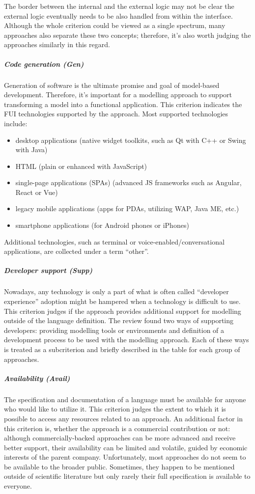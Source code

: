 The border between the internal and the external logic may not be clear\,\textemdash\,the external logic eventually needs to be also handled from within the interface.
Although the whole criterion could be viewed as a single spectrum, many approaches also separate these two concepts;
therefore, it's also worth judging the approaches similarly in this regard.

\subparagraph{Code generation (Gen)}
Generation of software is the ultimate promise and goal of model-based development.
Therefore, it's important for a modelling approach to support transforming a model into a functional application.
This criterion indicates the FUI technologies supported by the approach.
Most supported technologies include:
\begin{itemize}
    \item desktop applications (native widget toolkits, such as Qt with C++ or Swing with Java)
    \item HTML (plain or enhanced with JavaScript)
    \item single-page applications (SPAs) (advanced JS frameworks such as Angular, React or Vue)
    \item legacy mobile applications (apps for PDAs, utilizing WAP, Java ME, etc.)
    \item smartphone applications (for Android phones or iPhones)
\end{itemize}
Additional technologies, such as terminal or voice-enabled/conversational applications, are collected under a term \enquote{other}.

\subparagraph{Developer support (Supp)}
Nowadays, any technology is only a part of what is often called \enquote{developer experience}\,\textemdash\,adoption might be hampered when a technology is difficult to use.
This criterion judges if the approach provides additional support for modelling outside of the language definition.
The review found two ways of supporting developers: providing modelling tools or environments and definition of a development process to be used with the modelling approach.
Each of these ways is treated as a subcriterion and briefly described in the table for each group of approaches.

\subparagraph{Availability (Avail)}
The specification and documentation of a language must be available for anyone who would like to utilize it.
This criterion judges the extent to which it is possible to access any resources related to an approach.
An additional factor in this criterion is, whether the approach is a commercial contribution or not: although commercially-backed approaches can be more advanced and receive better support, their availability can be limited and volatile, guided by economic interests of the parent company.
Unfortunately, most approaches do not seem to be available to the broader public.
Sometimes, they happen to be mentioned outside of scientific literature but only rarely their full specification is available to everyone.

